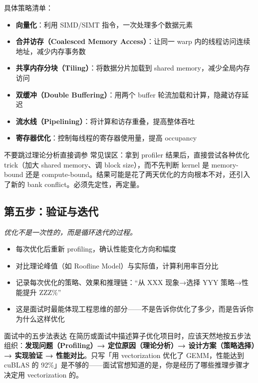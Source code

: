 \documentclass[a4paper]{article}
\begin{document}
具体策略清单：
\begin{itemize}
    \item \textbf{向量化}：利用 SIMD/SIMT 指令，一次处理多个数据元素
    \item \textbf{合并访存（Coalesced Memory Access）}：让同一 warp 内的线程访问连续地址，减少内存事务数
    \item \textbf{共享内存分块（Tiling）}：将数据分片加载到 shared memory，减少全局内存访问
    \item \textbf{双缓冲（Double Buffering）}：用两个 buffer 轮流加载和计算，隐藏访存延迟
    \item \textbf{流水线（Pipelining）}：将计算和访存重叠，提高整体吞吐
    \item \textbf{寄存器优化}：控制每线程的寄存器使用量，提高 occupancy
\end{itemize}

\begin{warningbox}{不要跳过理论分析直接调参}
常见误区：拿到 profiler 结果后，直接尝试各种优化 trick（加大 shared memory、调 block size），而不先判断 kernel 是 memory-bound 还是 compute-bound。结果可能是花了两天优化的方向根本不对，还引入了新的 bank conflict。必须先定性，再定量。
\end{warningbox}

\subsection{第五步：验证与迭代}

\emph{优化不是一次性的，而是循环迭代的过程。}

\begin{itemize}
    \item 每次优化后重新 profiling，确认性能变化方向和幅度
    \item 对比理论峰值（如 Roofline Model）与实际值，计算利用率百分比
    \item 记录每次优化的策略、效果和推理链：``从 XXX 现象→选择 YYY 策略→性能提升 ZZZ\%''
    \item 这是面试时最能体现工程思维的部分——不是告诉你优化了多少，而是告诉你为什么这样优化
\end{itemize}

\begin{importantbox}{面试中的五步法表达}
在简历或面试中描述算子优化项目时，应该天然地按五步法组织：\textbf{发现问题（Profiling）→ 定位原因（理论分析）→ 设计方案（策略选择）→ 实现验证 → 性能对比}。只写「用 vectorization 优化了 GEMM，性能达到 cuBLAS 的 92\%」是不够的——面试官想知道的是，你是经历了哪些推理步骤才决定用 vectorization 的。
\end{importantbox}
\end{document}
